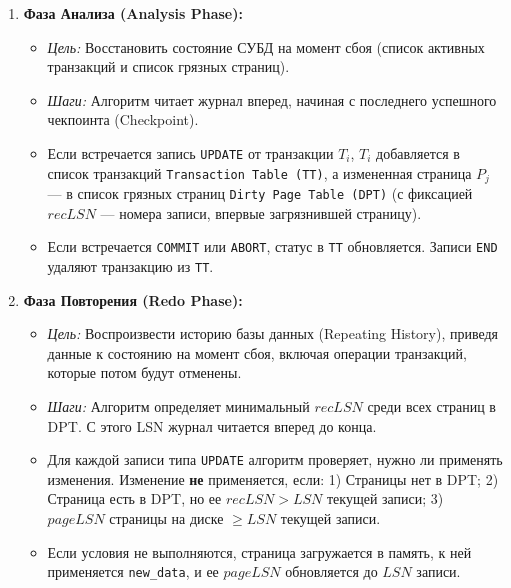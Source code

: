 \documentclass[a4paper,12pt]{article}
\begin{document}
\begin{enumerate}
    \item \textbf{Фаза Анализа (Analysis Phase):}
    \begin{itemize}
        \item \textit{Цель:} Восстановить состояние СУБД на момент сбоя (список активных транзакций и список грязных страниц).
        \item \textit{Шаги:} Алгоритм читает журнал вперед, начиная с последнего успешного чекпоинта (Checkpoint).
        \item Если встречается запись \texttt{UPDATE} от транзакции $T_i$, $T_i$ добавляется в список транзакций \texttt{Transaction Table (TT)}, а измененная страница $P_j$ — в список грязных страниц \texttt{Dirty Page Table (DPT)} (с фиксацией $recLSN$ — номера записи, впервые загрязнившей страницу).
        \item Если встречается \texttt{COMMIT} или \texttt{ABORT}, статус в \texttt{TT} обновляется. Записи \texttt{END} удаляют транзакцию из \texttt{TT}.
    \end{itemize}

    \item \textbf{Фаза Повторения (Redo Phase):}
    \begin{itemize}
        \item \textit{Цель:} Воспроизвести историю базы данных (Repeating History), приведя данные к состоянию на момент сбоя, включая операции транзакций, которые потом будут отменены.
        \item \textit{Шаги:} Алгоритм определяет минимальный $recLSN$ среди всех страниц в DPT. С этого LSN журнал читается вперед до конца.
        \item Для каждой записи типа \texttt{UPDATE} алгоритм проверяет, нужно ли применять изменения. Изменение \textbf{не} применяется, если:
        1) Страницы нет в DPT;
        2) Страница есть в DPT, но ее $recLSN > LSN$ текущей записи;
        3) $pageLSN$ страницы на диске $\ge LSN$ текущей записи.
        \item Если условия не выполняются, страница загружается в память, к ней применяется \texttt{new\_data}, и ее $pageLSN$ обновляется до $LSN$ записи.
    \end{itemize}


\end{enumerate}
\end{document}

